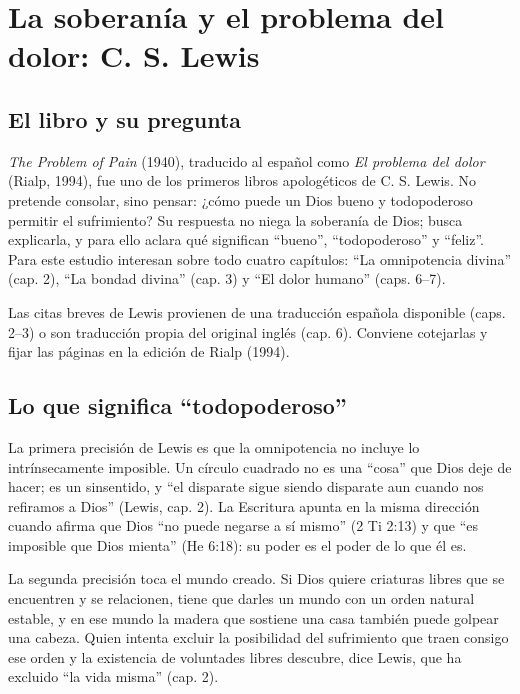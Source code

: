 \documentclass[11pt,letterpaper]{article}
\begin{document}
\section{La soberanía y el problema del dolor: C. S. Lewis}

\subsection{El libro y su pregunta}
\emph{The Problem of Pain} (1940), traducido al español como \emph{El problema del dolor} (Rialp, 1994), fue uno de los primeros libros apologéticos de C. S. Lewis. No pretende consolar, sino pensar: ¿cómo puede un Dios bueno y todopoderoso permitir el sufrimiento? Su respuesta no niega la soberanía de Dios; busca explicarla, y para ello aclara qué significan ``bueno'', ``todopoderoso'' y ``feliz''. Para este estudio interesan sobre todo cuatro capítulos: ``La omnipotencia divina'' (cap. 2), ``La bondad divina'' (cap. 3) y ``El dolor humano'' (caps. 6--7).

\begin{nota}[Precisión]
Las citas breves de Lewis provienen de una traducción española disponible (caps. 2--3) o son traducción propia del original inglés (cap. 6). Conviene cotejarlas y fijar las páginas en la edición de Rialp (1994).
\end{nota}

\subsection{Lo que significa ``todopoderoso''}
La primera precisión de Lewis es que la omnipotencia no incluye lo intrínsecamente imposible. Un círculo cuadrado no es una ``cosa'' que Dios deje de hacer; es un sinsentido, y ``el disparate sigue siendo disparate aun cuando nos refiramos a Dios'' (Lewis, cap. 2). La Escritura apunta en la misma dirección cuando afirma que Dios ``no puede negarse a sí mismo'' (2 Ti 2:13) y que ``es imposible que Dios mienta'' (He 6:18): su poder es el poder de lo que él es.

La segunda precisión toca el mundo creado. Si Dios quiere criaturas libres que se encuentren y se relacionen, tiene que darles un mundo con un orden natural estable, y en ese mundo la madera que sostiene una casa también puede golpear una cabeza. Quien intenta excluir la posibilidad del sufrimiento que traen consigo ese orden y la existencia de voluntades libres descubre, dice Lewis, que ha excluido ``la vida misma'' (cap. 2).
\end{document}
